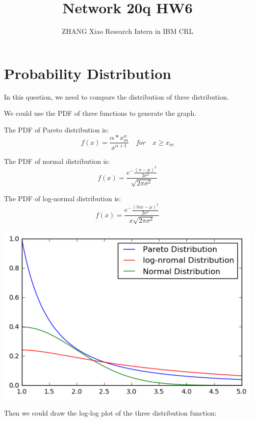 \documentclass[12pt,a4paper]{article}
\author{ZHANG Xiao Research Intern in IBM CRL}
\title{Network 20q HW6}
\begin{document}
\maketitle
\pagebreak

\section{Probability Distribution}
In this question, we need to compare the distribution of three distribution.

We could use the PDF of three functions to generate the graph.

The PDF of Pareto distribution is:
\begin{equation}
f(x) = \frac{\alpha*x_{m}^{\alpha}}{x^{\alpha+1}}  \quad  for \quad x \geq x_m
\end{equation}

The PDF of normal distribution is:
\begin{equation}
f(x) = \frac{e^-\frac{(x-\mu)^2}{2\sigma^2}}{\sqrt{2\pi\sigma^2}}
\end{equation}

The PDF of log-normal distribution is:
\begin{equation}
f(x) = \frac{e^-\frac{(ln x-\mu)^2}{2\sigma^2}}{x\sqrt{2\pi\sigma^2}}
\end{equation}

\includegraphics{PIC/distribution.png}

Then we could draw the log-log plot of the three distribution function:
\end{document}
